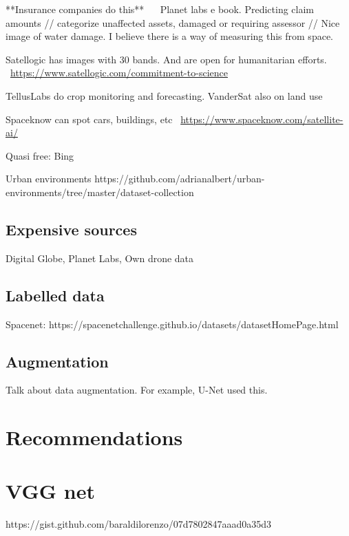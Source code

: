 \documentclass[12pt, a4paper, oneside, headinclude, footinclude]{article}
\begin{document}
**Insurance companies do this** ~~ Planet labs e book.
Predicting claim amounts // categorize unaffected assets, damaged or requiring
assessor // 
Nice image of water damage. I believe there is a way of measuring this from
space.

Satellogic has images with 30 bands. And are open for humanitarian efforts. ~\url{https://www.satellogic.com/commitment-to-science}

TellusLabs do crop monitoring and forecasting. VanderSat also on land use

Spaceknow can spot cars, buildings, etc
~\url{https://www.spaceknow.com/satellite-ai/}

Quasi free: Bing

Urban environments https://github.com/adrianalbert/urban-environments/tree/master/dataset-collection

\subsection{Expensive sources}

Digital Globe, Planet Labs, Own drone data

\subsection{Labelled data}

Spacenet: https://spacenetchallenge.github.io/datasets/datasetHomePage.html

\subsection{Augmentation}

Talk about data augmentation. For example, U-Net used this.

\section{Recommendations}

\appendix

\section{VGG net}
https://gist.github.com/baraldilorenzo/07d7802847aaad0a35d3
\end{document}

